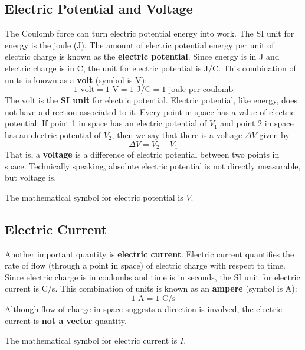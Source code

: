 \subsection{Electric Potential and Voltage}
%
The Coulomb force can turn electric potential energy into work. The SI unit for energy is the joule (J). The amount of electric potential energy per unit of electric charge is known as the \textbf{electric potential}. Since energy is in J and electric charge is in C, the unit for electric potential is J/C. This combination of units is known as a \textbf{volt} (symbol is V):
\begin{equation}
	1 \text{ volt} = 1 \text{ V} = 1 \text{ J/C} = 1 \text{ joule per coulomb}
\end{equation}
The volt is the \textbf{SI unit} for electric potential. Electric potential, like energy, does not have a direction associated to it. Every point in space has a value of electric potential. If point 1 in space has an electric potential of $V_{1}$ and point 2 in space has an electric potential of $V_{2}$, then we say that there is a voltage $\Delta V$ given by
\begin{equation}
	\Delta V = V_{2} - V_{1}
\end{equation}
That is, a \textbf{voltage} is a difference of electric potential between two points in space. Technically speaking, absolute electric potential is not directly measurable, but voltage is.

The mathematical symbol for electric potential is $V$.
%
\subsection{Electric Current}
%
Another important quantity is \textbf{electric current}. Electric current quantifies the rate of flow (through a point in space) of electric charge with respect to time. Since electric charge is in coulombs and time is in seconds, the SI unit for electric current is C/s. This combination of units is known as an \textbf{ampere} (symbol is A):
\begin{equation}
	1 \text{ A} = 1 \text{ C/s}
\end{equation}
Although flow of charge in space suggests a direction is involved, the electric current is \textbf{not a vector} quantity.

The mathematical symbol for electric current is $I$.
%
